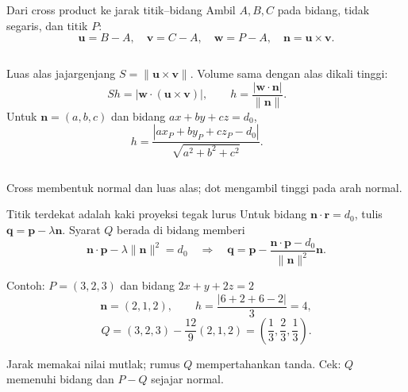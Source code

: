 \documentclass[11pt,aspectratio=169]{beamer}
\newcommand{\vect}[1]{\boldsymbol{#1}}
\begin{document}
\begin{frame}{Dari cross product ke jarak titik--bidang}
\small
Ambil $A,B,C$ pada bidang, tidak segaris, dan titik $P$:
\[
\vect{u}=B-A,\quad\vect{v}=C-A,\quad\vect{w}=P-A,\quad
\vect{n}=\vect{u}\times\vect{v}.
\]
\begin{columns}[T,onlytextwidth]
Luas alas jajargenjang $S=\|\vect{u}\times\vect{v}\|$.
Volume sama dengan alas dikali tinggi:
\[
Sh=|\vect{w}\cdot(\vect{u}\times\vect{v})|,
\qquad h=\frac{|\vect{w}\cdot\vect{n}|}{\|\vect{n}\|}.
\]
Untuk $\vect{n}=(a,b,c)$ dan bidang $ax+by+cz=d_0$,
\[
\boxed{h=\frac{|ax_P+by_P+cz_P-d_0|}{\sqrt{a^2+b^2+c^2}}}.
\]
\centering
{}\par
\end{columns}
\medskip
\textcolor{Accent}{Cross membentuk normal dan luas alas; dot mengambil tinggi pada arah normal.}
\end{frame}

\begin{frame}{Titik terdekat adalah kaki proyeksi tegak lurus}
\small
Untuk bidang $\vect{n}\cdot\vect{r}=d_0$, tulis $\vect{q}=\vect{p}-\lambda\vect{n}$.
Syarat $Q$ berada di bidang memberi
\[
\vect{n}\cdot\vect{p}-\lambda\|\vect{n}\|^2=d_0
\quad\Longrightarrow\quad
\boxed{\vect{q}=\vect{p}-\frac{\vect{n}\cdot\vect{p}-d_0}{\|\vect{n}\|^2}\vect{n}}.
\]
\begin{block}{Contoh: $P=(3,2,3)$ dan bidang $2x+y+2z=2$}
\[
\vect{n}=(2,1,2),\qquad h=\frac{|6+2+6-2|}{3}=4,
\]
\[
Q=(3,2,3)-\frac{12}{9}(2,1,2)
=\left(\frac13,\frac23,\frac13\right).
\]
\end{block}
Jarak memakai nilai mutlak; rumus $Q$ mempertahankan tanda.
Cek: $Q$ memenuhi bidang dan $P-Q$ sejajar normal.
\end{frame}
\end{document}
